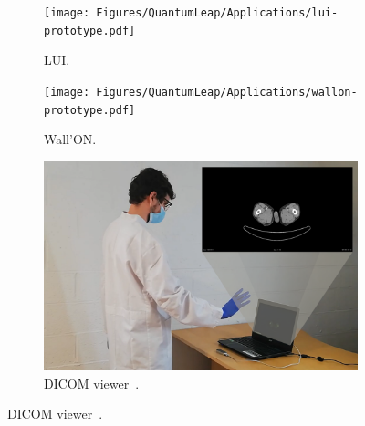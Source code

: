 \begin{figure}[t]
    \centering
    \begin{subfigure}{.259\textwidth}
        \centering
        \texttt{[image: Figures/QuantumLeap/Applications/lui-prototype.pdf]}  
        \vspace{-15pt}
        \captionsetup{width=.9\linewidth}
        \caption{LUI.}
        \label{fig:quantumleap:apps:lui}
    \end{subfigure}
    \begin{subfigure}{.337\textwidth}
        \centering
        \texttt{[image: Figures/QuantumLeap/Applications/wallon-prototype.pdf]}  
        \vspace{-15pt}
        \captionsetup{width=.9\linewidth}
        \caption{Wall'ON.}
        \label{fig:quantumleap:apps:wallon}
    \end{subfigure}
    \begin{subfigure}{.383\textwidth}
        \centering
        \includegraphics[width=\linewidth,trim={4.5cm 0 0 0},clip]{Figures/QuantumLeap/Applications/dicom-prototype.pdf}  
        \vspace{-15pt}
        \captionsetup{width=.9\linewidth}
        \caption{DICOM viewer~\cite{Nothomb:2020}.}
        \label{fig:quantumleap:apps:dicom}
    \end{subfigure}


\end{figure}
